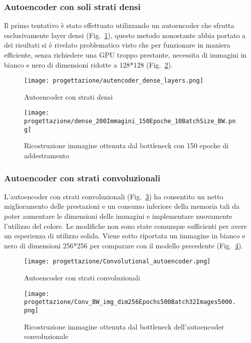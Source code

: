 \subsubsection{Autoencoder con soli strati densi}
Il primo tentativo è stato effettuato utilizzando un autoencoder che sfrutta esclusivamente layer densi (Fig.~\ref{fig:schema-denso}), questo metodo nonostante abbia portato a dei risultati si è rivelato problematico visto che per funzionare in maniera efficiente, senza richiedere una GPU troppo prestante, necessita di immagini in bianco e nero di dimensioni ridotte a 128*128 (Fig.~\ref{fig:dense-ricostruita}).

\begin{figure}[!h] 
  \centering 
  \texttt{[image: progettazione/autencoder\_dense\_layers.png]} 
  \caption{Autoencoder con strati densi}
  \label{fig:schema-denso}
\end{figure}


\begin{figure}[!h] 
  \centering 
  \texttt{[image: progettazione/dense\_200Immagini\_150Epoche\_10BatchSize\_BW.png]} 
  \caption{Ricostruzione immagine ottenuta dal bottleneck con 150 epoche di addestramento}
  \label{fig:dense-ricostruita}
\end{figure}

\newpage

\subsubsection{Autoencoder con strati convoluzionali}
L'autoencoder con strati convoluzionali (Fig.~\ref{fig:schema-conv}) ha consentito un netto miglioramento delle prestazioni e un consumo inferiore della memoria tali da poter aumentare le dimensioni delle immagini e implementare nuovamente l'utilizzo del colore.
Le modifiche non sono state comunque sufficienti per avere un esperienza di utilizzo solida.
Viene sotto riportata un immagine in bianco e nero di dimensioni 256*256 per comparare con il modello precedente (Fig.~\ref{fig:conv-ricostruita}).

\begin{figure}[!h] 
  \centering 
  \texttt{[image: progettazione/Convolutional\_autoencoder.png]} 
  \caption{Autoencoder con strati convoluzionali}
  \label{fig:schema-conv}
\end{figure}


\begin{figure}[!h] 
  \centering 
  \texttt{[image: progettazione/Conv\_BW\_img\_dim256Epochs500Batch32Images5000.png]} 
  \caption{Ricostruzione immagine ottenuta dal bottleneck dell'autoencoder convoluzionale}
  \label{fig:conv-ricostruita}
\end{figure}

